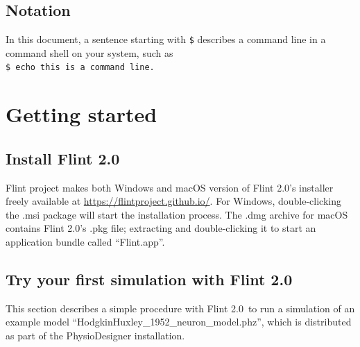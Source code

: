 \documentclass[a4paper,10pt]{report}
\def\FlintVersion{2.0}
\def\Flint{Flint \FlintVersion}
\begin{document}
\section{Notation}
In this document, a sentence starting with {\tt \$} describes a command line in
a command shell on your system, such as\\
{\tt \$ echo this is a command line.}



\chapter{Getting started}

\section{Install \Flint}
Flint project makes both Windows and macOS version of \Flint's installer freely
available at \url{https://flintproject.github.io/}.
For Windows, double-clicking the .msi package will start the installation
process.
The .dmg archive for macOS contains \Flint's .pkg file; extracting and
double-clicking it to start an application bundle called ``Flint.app''.

\section{Try your first simulation with \Flint}
This section describes a simple procedure with \Flint\ to run a simulation of an
example model ``HodgkinHuxley\_1952\_neuron\_model.phz'', which is distributed
as part of the PhysioDesigner \cite{PhysioDesigner} installation.
\end{document}
